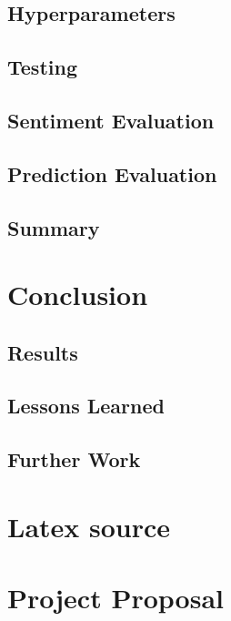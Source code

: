 \documentclass[12pt,a4paper,twoside,openright]{report}
\begin{document}
\section{Hyperparameters}

\section{Testing}

\section{Sentiment Evaluation}

\section{Prediction Evaluation}

\section{Summary}

\chapter{Conclusion}

\section{Results}

\section{Lessons Learned}

\section{Further Work}

 



\appendix

\chapter{Latex source}


\chapter{Project Proposal}
\end{document}
